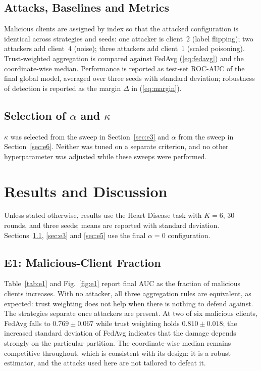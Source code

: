 \documentclass[10pt,twocolumn,letterpaper]{article}
\begin{document}
\subsection{Attacks, Baselines and Metrics}
Malicious clients are assigned by index so that the attacked configuration is
identical across strategies and seeds: one attacker is client~2 (label
flipping); two attackers add client~4 (noise); three attackers add client~1
(scaled poisoning). Trust-weighted aggregation is compared against FedAvg
(\ref{eq:fedavg}) and the coordinate-wise median.
Performance is reported as test-set ROC-AUC of the final global model,
averaged over three seeds with standard deviation; robustness of detection is
reported as the margin $\Delta$ in (\ref{eq:margin}).

\subsection{Selection of $\alpha$ and $\kappa$}
$\kappa$ was selected from the sweep in Section~\ref{sec:e3} and $\alpha$
from the sweep in Section~\ref{sec:e6}. Neither was tuned on a separate
criterion, and no other hyperparameter was adjusted while these sweeps were
performed.

\section{Results and Discussion}

Unless stated otherwise, results use the Heart Disease task with $K=6$,
30 rounds, and three seeds; means are reported with standard deviation.
Sections~\ref{sec:e1}, \ref{sec:e3} and \ref{sec:e5} use the final
$\alpha=0$ configuration.

\subsection{E1: Malicious-Client Fraction}
\label{sec:e1}
Table~\ref{tab:e1} and Fig.~\ref{fig:e1} report final AUC as the fraction of
malicious clients increases. With no attacker, all three aggregation rules
are equivalent, as expected: trust weighting does not help when there is
nothing to defend against. The strategies separate once attackers are
present. At two of six malicious clients, FedAvg falls to
$0.769 \pm 0.067$ while trust weighting holds $0.810 \pm 0.018$; the
increased standard deviation of FedAvg indicates that the damage depends
strongly on the particular partition. The coordinate-wise median remains
competitive throughout, which is consistent with its design: it is a robust
estimator, and the attacks used here are not tailored to defeat it.
\end{document}
